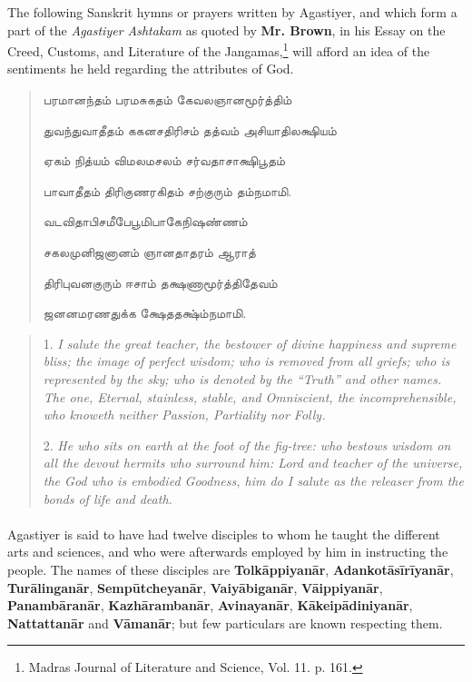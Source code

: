 \documentclass{article}
\newcommand{\TamilText}[1]{\texttamil{#1}}
\newcommand{\tam}[1]{\TamilText{#1}}
\begin{document}
The following Sanskrit hymns or prayers written by Agastiyer, and which form a part of the \emph{Agastiyer Ashtakam} as quoted by \textbf{Mr. Brown}, in his Essay on the Creed, Customs, and Literature of the Jangamas,\footnote{Madras Journal of Literature and Science, Vol. 11. p. 161.} will afford an idea of the sentiments he held regarding the attributes of God.
\begin{quotation}\small
\tam{பரமானந்தம்‌ பரமசுகதம்‌ கேவலஞானமூர்த்திம்‌}

\tam{துவந்துவாதீதம்‌ ககனசதிரிசம்‌ தத்வம்‌ அசியாதிலக்ஷியம்‌}

\tam{ஏகம்‌ நித்யம்‌ விமலமசலம்‌ சர்வதாசாக்ஷிபூதம்‌}

\tam{பாவாதீதம்‌ திரிகுணரகிதம்‌ சற்குரும்‌ தம்நமாமி}.

\bigskip

\tam{வடவிதாபிசமீபேபூமிபாகேநிஷண்ணம்‌}

\tam{சகலமுனிஜனானம்‌ ஞானதாதரம்‌ ஆராத்‌}

\tam{திரிபுவனகுரும்‌ ஈசாம்‌ தக்ஷணாமூர்த்திதேவம்‌}

\tam{ஜனனமரணதுக்க க்ஷேததக்ஷ்ம்நமாமி}.
\end{quotation}
\begin{quotation}\small
1. \emph{I salute the great teacher, the bestower of divine happiness and supreme bliss; the image of perfect wisdom; who is removed from all griefs; who is represented by the sky; who is denoted by the ``Truth'' and other names. The one, Eternal, stainless, stable, and Omniscient, the incomprehensible, who knoweth neither Passion, Partiality nor Folly.}

2. \emph{He who sits on earth at the foot of the fig-tree: who bestows wisdom on all the devout hermits who surround him: Lord and teacher of the universe, the God who is embodied Goodness, him do I salute as the releaser from the bonds of life and death.}
\end{quotation}
\paragraph{}
Agastiyer is said to have had twelve disciples to whom he taught the different arts and sciences, and who were afterwards employed by him in instructing the people. The names of these disciples are \textbf{Tolk\={a}ppiyan\={a}r}, \textbf{Adankot\={a}s\={i}r\={i}yan\={a}r}, \textbf{Tur\={a}lingan\={a}r}, \textbf{Semp\={u}tcheyan\={a}r}, \textbf{Vaiy\={a}bigan\={a}r}, \textbf{V\={a}ippiyan\={a}r}, \textbf{Panamb\={a}ran\={a}r}, \textbf{Kazh\={a}ramban\={a}r}, \textbf{Avinayan\={a}r}, \textbf{K\={a}keip\={a}diniyan\={a}r}, \textbf{Nattattan\={a}r} and \textbf{V\={a}man\={a}r}; but few particulars are known respecting them.
\end{document}
